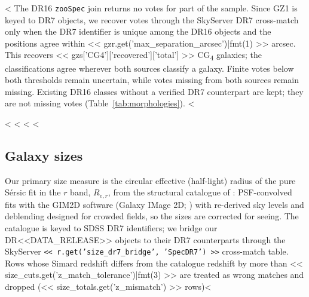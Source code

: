 \documentclass{aa}
\newcommand{\CG}{CG\textsubscript{4}}
\begin{document}
<%
The DR16 \texttt{zooSpec} join returns no votes for part of the sample. Since GZ1 is keyed to DR7 objects, we recover votes through the SkyServer DR7 cross-match only when the DR7 identifier is unique among the DR16 objects and the positions agree within << gzr.get('max_separation_arcsec')|fmt(1) >> arcsec. This recovers << gzs['CG4']['recovered']['total'] >> \CG{} galaxies; the classifications agree wherever both sources classify a galaxy. Finite votes below both thresholds remain uncertain, while votes missing from both sources remain missing. Existing DR16 classes without a verified DR7 counterpart are kept; they are not missing votes (Table~\ref{tab:morphologies}). <%

<%
<%
<%
<%
\subsection{Galaxy sizes}\label{sec:size_data}

Our primary size measure is the circular effective (half-light) radius of the pure S\'ersic fit in the $r$ band, \(R_{e,r}\), from the structural catalogue of \citet{Simard2011}: PSF-convolved fits with the GIM2D software (Galaxy IMage 2D; \citealt{Simard+02}) with re-derived sky levels and deblending designed for crowded fields, so the sizes are corrected for seeing. The catalogue is keyed to SDSS DR7 identifiers; we bridge our DR<<DATA_RELEASE>> objects to their DR7 counterparts through the SkyServer \texttt{<< r.get('size_dr7_bridge', 'SpecDR7') >>} cross-match table. Rows whose Simard redshift differs from the catalogue redshift by more than << size_cuts.get('z_match_tolerance')|fmt(3) >> are treated as wrong matches and dropped (<< size_totals.get('z_mismatch') >> rows)<%
\end{document}
